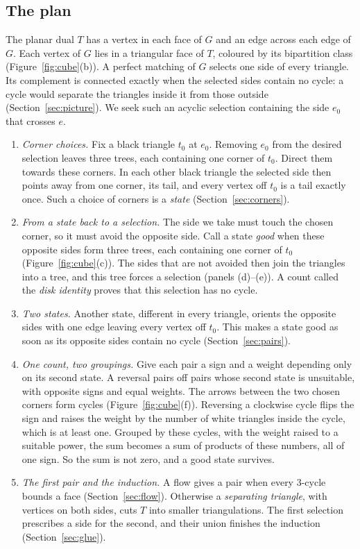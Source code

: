 \documentclass[10pt]{amsart}
\numberwithin{equation}{section}
\theoremstyle{definition}
\theoremstyle{remark}
\newcommand{\T}{T}
\begin{document}
\subsection*{The plan}
The planar dual $\T$ has a vertex in each face of $G$ and an edge across each edge of $G$.
Each vertex of $G$ lies in a triangular face of $\T$, coloured by its bipartition class (Figure~\ref{fig:cube}(b)).
A perfect matching of $G$ selects one side of every triangle.
Its complement is connected exactly when the selected sides contain no cycle: a cycle would separate the triangles inside it from those outside (Section~\ref{sec:picture}).
We seek such an acyclic selection containing the side $e_0$ that crosses $e$.
\begin{enumerate}
\item \emph{Corner choices.} Fix a black triangle $t_0$ at $e_0$.
Removing $e_0$ from the desired selection leaves three trees, each containing one corner of $t_0$.
Direct them towards these corners.
In each other black triangle the selected side then points away from one corner, its tail, and every vertex off $t_0$ is a tail exactly once.
Such a choice of corners is a \emph{state} (Section~\ref{sec:corners}).
\item \emph{From a state back to a selection.} The side we take must touch the chosen corner, so it must avoid the opposite side.
Call a state \emph{good} when these opposite sides form three trees, each containing one corner of $t_0$ (Figure~\ref{fig:cube}(c)).
The sides that are not avoided then join the triangles into a tree, and this tree forces a selection (panels (d)--(e)).
A count called the \emph{disk identity} proves that this selection has no cycle.
\item \emph{Two states.} Another state, different in every triangle, orients the opposite sides with one edge leaving every vertex off $t_0$.
This makes a state good as soon as its opposite sides contain no cycle (Section~\ref{sec:pairs}).
\item \emph{One count, two groupings.} Give each pair a sign and a weight depending only on its second state.
A reversal pairs off pairs whose second state is unsuitable, with opposite signs and equal weights.
The arrows between the two chosen corners form cycles (Figure~\ref{fig:cube}(f)).
Reversing a clockwise cycle flips the sign and raises the weight by the number of white triangles inside the cycle, which is at least one.
Grouped by these cycles, with the weight raised to a suitable power, the sum becomes a sum of products of these numbers, all of one sign.
So the sum is not zero, and a good state survives.
\item \emph{The first pair and the induction.} A flow gives a pair when every $3$-cycle bounds a face (Section~\ref{sec:flow}).
Otherwise a \emph{separating triangle}, with vertices on both sides, cuts $\T$ into smaller triangulations.
The first selection prescribes a side for the second, and their union finishes the induction (Section~\ref{sec:glue}).
\end{enumerate}
\end{document}
